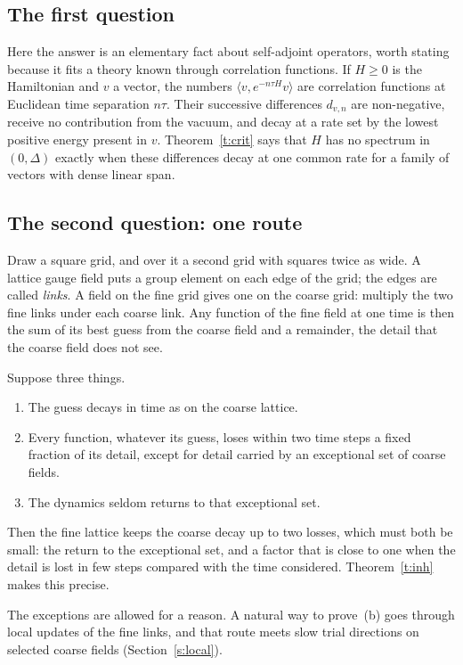 \subsection{The first question}
Here the answer is an elementary fact about self-adjoint operators, worth stating because it fits a theory
known through correlation functions. If $H\ge0$ is the Hamiltonian and $v$ a vector, the numbers
$\langle v,e^{-n\tau H}v\rangle$ are correlation functions at Euclidean time separation $n\tau$. Their
successive differences $d_{v,n}$ are non-negative, receive no contribution from the vacuum, and decay at a
rate set by the lowest positive energy present in $v$. Theorem~\ref{t:crit} says that $H$ has no spectrum in
$(0,\Delta)$ exactly when these differences decay at one common rate for a family of vectors with dense
linear span.

\subsection{The second question: one route}
Draw a square grid, and over it a second grid with squares twice as wide. A lattice gauge field puts a group
element on each edge of the grid; the edges are called \emph{links}. A field on the fine grid gives one on
the coarse grid: multiply the two fine links under each coarse link. Any function of the fine field at one
time is then the sum of its best guess from the coarse field and a remainder, the detail that the coarse
field does not see.

Suppose three things.
\begin{enumerate}
\item[(a)] The guess decays in time as on the coarse lattice.
\item[(b)] Every function, whatever its guess, loses within two time steps a fixed fraction of its detail,
except for detail carried by an exceptional set of coarse fields.
\item[(c)] The dynamics seldom returns to that exceptional set.
\end{enumerate}
Then the fine lattice keeps the coarse decay up to two losses, which must both be small: the return to
the exceptional set, and a factor that is close to one when the detail is lost in few steps compared with
the time considered. Theorem~\ref{t:inh} makes this precise.

The exceptions are allowed for a reason. A natural way to prove~(b) goes through local updates of the fine
links, and that route meets slow trial directions on selected coarse fields (Section~\ref{s:local}).

